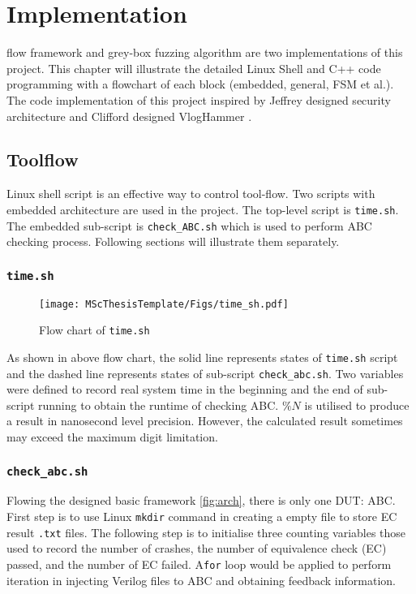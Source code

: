 \chapter{Implementation}
\renewcommand{\baselinestretch}{\mystretch}
\label{chap:Fuzzer}
 flow framework and grey-box fuzzing algorithm are two implementations of this project. This chapter will illustrate the detailed Linux Shell and C++ code programming with a flowchart of each block (embedded, general, FSM et al.). The code implementation of this project inspired by Jeffrey designed security architecture \cite{dwoskin2010framework} and Clifford designed VlogHammer \cite{clifford}. 
\section{Toolflow}
Linux shell script is an effective way to control tool-flow. Two scripts with embedded architecture are used in the project. The top-level script is \texttt{time.sh}. The embedded sub-script is \texttt{check\_ABC.sh} which is used to perform ABC checking process. Following sections will illustrate them separately. 
\subsection{\texttt{time.sh}}
\begin{figure}[htb]
    \centering
    \texttt{[image: MScThesisTemplate/Figs/time\_sh.pdf]}
    \caption{\footnotesize Flow chart of \texttt{time.sh}}
    \label{fig:time.sh}
\end{figure}
As shown in above flow chart, the solid line represents states of \texttt{time.sh} script and the dashed line represents states of sub-script \texttt{check\_abc.sh}.  Two variables were defined to record real system time in the beginning and the end of sub-script running to obtain the runtime of checking  ABC. $\%N$ is utilised to produce a result in nanosecond level precision. However, the calculated result sometimes may exceed the maximum digit limitation. 
\subsection{\texttt{check\_abc.sh}}
Flowing the designed basic framework \ref{fig:arch}, there is only one DUT: ABC. First step is to use Linux \texttt{mkdir} command in creating a empty file to store EC result \texttt{.txt} files. The following step is to initialise three counting variables those used to record the number of crashes, the number of equivalence check (EC) passed, and the number of EC failed. A\texttt{for} loop would be applied to perform iteration in injecting Verilog files to ABC and obtaining feedback information. 

